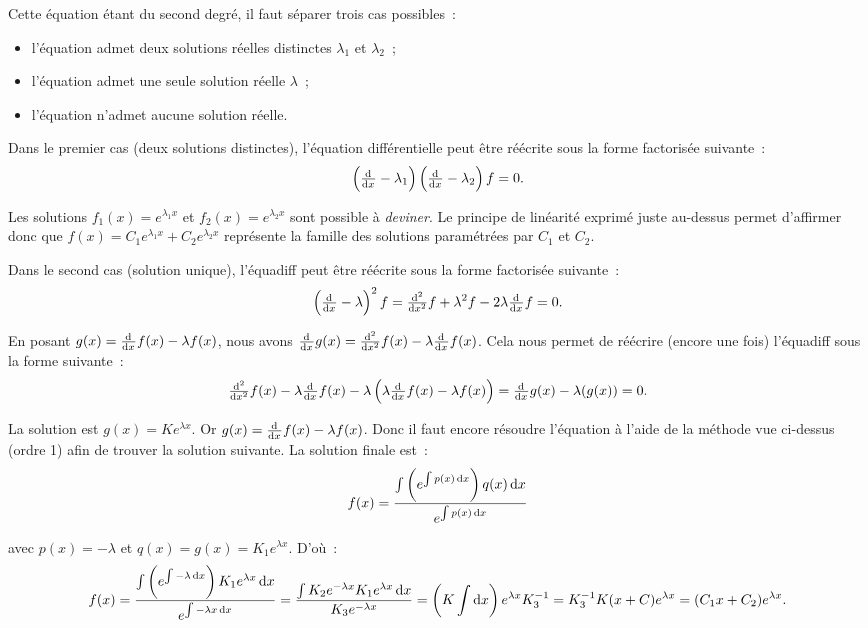 \documentclass{article}
\theoremstyle{definition}
\theoremstyle{remark}
\begin{document}
			Cette équation étant du second degré, il faut séparer trois cas possibles~:
			\begin{itemize}
				\item l'équation admet deux solutions réelles distinctes $\lambda_1$ et $\lambda_2$~;
				\item l'équation admet une seule solution réelle $\lambda$~;
				\item l'équation n'admet aucune solution réelle.
			\end{itemize}

			Dans le premier cas (deux solutions distinctes), l'équation différentielle peut être réécrite sous la forme factorisée suivante~:
			\[\left(\od{}{x} - \lambda_1\right)\left(\od{}{x} - \lambda_2\right)f = 0.\]

			Les solutions $f_1(x) = e^{\lambda_1 x}$ et $f_2(x) = e^{\lambda_2 x}$ sont possible à \textit{deviner}. Le principe de linéarité exprimé juste au-dessus
			permet d'affirmer donc que $f(x) = C_1e^{\lambda_1 x} + C_2e^{\lambda_2 x}$ représente la famille des solutions paramétrées par $C_1$ et $C_2$.

			Dans le second cas (solution unique), l'équadiff peut être réécrite sous la forme factorisée suivante~:
			\[\left(\od{}{x} - \lambda\right)^2f = \od[2]{}{x}f + \lambda^2f - 2\lambda\od{}{x}f = 0.\]

			En posant $g(x) = \od{}{x}f(x) - \lambda f(x)$, nous avons $\od{}{x}g(x) = \od[2]{}{x}f(x) - \lambda\od{}{x}f(x)$. Cela nous permet de réécrire (encore une
			fois) l'équadiff sous la forme suivante~:
			\[\od[2]{}{x}f(x) - \lambda\od{}{x}f(x) - \lambda\left(\lambda\od{}{x}f(x) - \lambda f(x)\right) = \od{}{x}g(x) - \lambda(g(x)) = 0.\]

			La solution est $g(x) = Ke^{\lambda x}$. Or $g(x) = \od{}{x}f(x) - \lambda f(x)$. Donc il faut encore résoudre l'équation à l'aide de la méthode vue ci-dessus
			(ordre 1) afin de trouver la solution suivante. La solution finale est~:
			\[f(x) = \frac {\int \left(e^{\int p(x) \dif x}\right) q(x) \dif x}{e^{\int p(x) \dif x}}\]

			avec $p(x) = -\lambda$ et $q(x) = g(x) = K_1e^{\lambda x}$. D'où~:
			\[
				f(x) = \frac {\int \left(e^{\int -\lambda \dif x}\right) K_1e^{\lambda x} \dif x}{e^{\int -\lambda x \dif x}}
				     = \frac {\int K_2e^{-\lambda x}K_1e^{\lambda x} \dif x}{K_3e^{-\lambda x}}
				     = \left(K\int\dif x\right)e^{\lambda x}K_3^{-1} = K_3^{-1}K(x + C)e^{\lambda x} = (C_1x + C_2)e^{\lambda x}.
			\]
\end{document}
